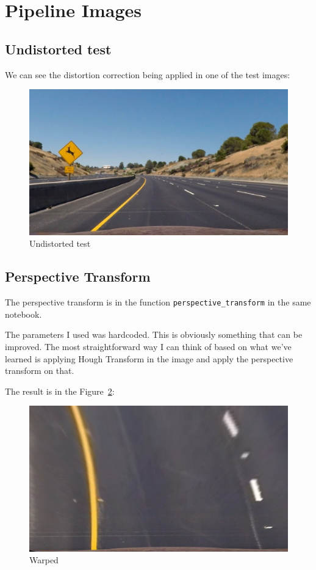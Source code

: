 \documentclass[11pt, a4paper]{article}
\begin{document}
\section{Pipeline Images}
\label{sec:pipeline_images}

\subsection{Undistorted test}%
\label{sub:undistorted_test}


We can see the distortion correction being applied in one of the test images:

\begin{figure}[htb!]
	\centering
	\includegraphics[width=0.8\linewidth]{undist}
	\caption{Undistorted test}
	\label{fig:undistorted_test}
\end{figure}

\subsection{Perspective Transform}%
\label{sub:perspective_transform}

The perspective transform is in the function \texttt{perspective\_transform} in the same notebook.

The parameters I used was hardcoded. This is obviously something that can be improved. The most straightforward way I can think of based on what we've learned is applying Hough Transform in the image and apply the perspective transform on that. 

The result is in the Figure~\ref{fig:warped}:


\begin{figure}[htb!]
	\centering
	\includegraphics[width=0.8\linewidth]{warped}
	\caption{Warped}
	\label{fig:warped}
\end{figure}
\end{document}
